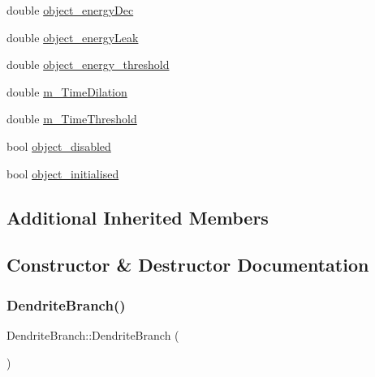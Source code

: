 \begin{DoxyCompactItemize}
double \mbox{\hyperlink{classDendriteBranch_a5d77cb55a6f5d986d671970cf284bd7f}{object\+\_\+energy\+Dec}}
\item 
double \mbox{\hyperlink{classDendriteBranch_ac3fb26edaf6f895856c1ec6db8e50781}{object\+\_\+energy\+Leak}}
\item 
double \mbox{\hyperlink{classDendriteBranch_a261cb8f1bc667b0f412b15f2308f63eb}{object\+\_\+energy\+\_\+threshold}}
\item 
double \mbox{\hyperlink{classDendriteBranch_a26ac4fd971258f19d15ccdc7d7f6b8c8}{m\+\_\+\+Time\+Dilation}}
\item 
double \mbox{\hyperlink{classDendriteBranch_aab9a65d713c085277489bfdc6255ed36}{m\+\_\+\+Time\+Threshold}}
\item 
bool \mbox{\hyperlink{classDendriteBranch_adb05fc412eaeef001fe62550e543b9b1}{object\+\_\+disabled}}
\item 
bool \mbox{\hyperlink{classDendriteBranch_a061380e64b7632973504c4b5ecb53d65}{object\+\_\+initialised}}
\end{DoxyCompactItemize}
\subsection*{Additional Inherited Members}


\subsection{Constructor \& Destructor Documentation}
\mbox{\label{classDendriteBranch_af391f5fd2379539523b3d2523c59ea8b}} 
\subsubsection{\texorpdfstring{Dendrite\+Branch()}{DendriteBranch()}\hspace{0.1cm}{\footnotesize\ttfamily [1/4]}}
{\footnotesize\ttfamily Dendrite\+Branch\+::\+Dendrite\+Branch (\begin{DoxyParamCaption}{ }\end{DoxyParamCaption})\hspace{0.3cm}{\ttfamily [inline]}}

\mbox{\label{classDendriteBranch_a391ba1440a6c29a0752b03eb60357370}} 

